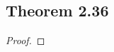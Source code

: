 \documentclass[../../main.tex]{subfiles}
\begin{document}
\subsection{Theorem 2.36}
\begin{wts}

\end{wts}
\begin{proof}

\end{proof}
\end{document}
